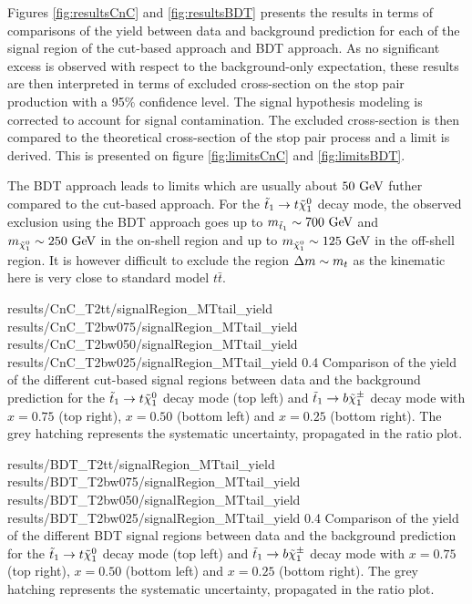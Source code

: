     Figures \ref{fig:resultsCnC} and \ref{fig:resultsBDT} presents the results in terms of comparisons of the yield between data and background prediction for each of the signal region of the cut-based approach and BDT approach. As no significant excess is observed with respect to the background-only expectation, these results are then interpreted in terms of excluded cross-section on the stop pair production with a 95\% confidence level. The signal hypothesis modeling is corrected to account for signal contamination. The excluded cross-section is then compared to the theoretical cross-section of the stop pair process and a limit is derived. This is presented on figure \ref{fig:limitsCnC} and \ref{fig:limitsBDT}.
    
    The BDT approach leads to limits which are usually about $50 ~\text{GeV}$ futher compared to the cut-based approach. For the $\tilde{t}_1 \rightarrow t \tilde{\chi}_1^0$ decay mode, the observed exclusion using the BDT approach goes up to $m_{\tilde{t}_1} \sim 700 ~\text{GeV}$ and $m_{\tilde{\chi}_1^0} \sim 250 ~\text{GeV}$ in the on-shell region and up to $m_{\tilde{\chi}_1^0} \sim 125 ~\text{GeV}$ in the off-shell region. It is however difficult to exclude the region $\Delta m \sim m_{t}$ as the kinematic here is very close to standard model $t\bar{t}$.

                          {results/CnC_T2tt/signalRegion_MTtail_yield}
                          {results/CnC_T2bw075/signalRegion_MTtail_yield}
                          {results/CnC_T2bw050/signalRegion_MTtail_yield}
                          {results/CnC_T2bw025/signalRegion_MTtail_yield}
                          {0.4}
                          {Comparison of the yield of the different cut-based signal regions between data and the background prediction for the $\tilde{t}_1 \rightarrow t \tilde{\chi}_1^0$ decay mode (top left) and $\tilde{t}_1 \rightarrow b \tilde{\chi}_1^\pm$ decay mode with $x=0.75$ (top right), $x=0.50$ (bottom left) and $x=0.25$ (bottom right). The grey hatching represents the systematic uncertainty, propagated in the ratio plot.}
            
                          {results/BDT_T2tt/signalRegion_MTtail_yield}
                          {results/BDT_T2bw075/signalRegion_MTtail_yield}
                          {results/BDT_T2bw050/signalRegion_MTtail_yield}
                          {results/BDT_T2bw025/signalRegion_MTtail_yield}
                          {0.4}
                          {Comparison of the yield of the different BDT signal regions between data and the background prediction for the $\tilde{t}_1 \rightarrow t \tilde{\chi}_1^0$ decay mode (top left) and $\tilde{t}_1 \rightarrow b \tilde{\chi}_1^\pm$ decay mode with $x=0.75$ (top right), $x=0.50$ (bottom left) and $x=0.25$ (bottom right). The grey hatching represents the systematic uncertainty, propagated in the ratio plot.}

